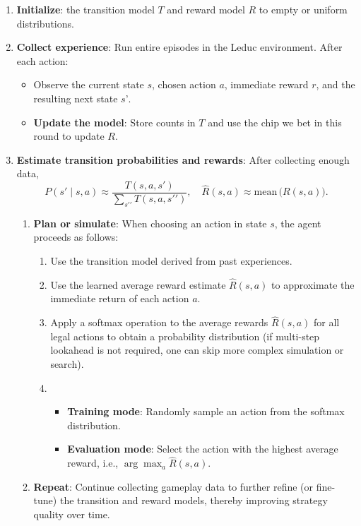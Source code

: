 \documentclass{article}
\begin{document}
\begin{enumerate}
\item \textbf{Initialize}: the transition model $T$ and reward model $R$ to empty or uniform distributions.
\item \textbf{Collect experience}: Run entire episodes in the Leduc environment. After each action:
\begin{itemize}
\item Observe the current state $s$, chosen action $a$, immediate reward $r$, and the resulting next state $s’$.
\item \textbf{Update the model}:
Store counts in $T$ and use the chip we bet in this round to update $R$.
\end{itemize}
\item \textbf{Estimate transition probabilities and rewards}: After collecting enough data,
\[
P(s{\prime} \mid s, a) \approx \frac{T(s, a, s{\prime})}{\sum_{s{\prime}{\prime}} T(s, a, s{\prime}{\prime})},
\quad
\hat{R}(s, a) \approx \text{mean}\,\bigl(R(s, a)\bigr).
\]
\begin{enumerate}
\item \textbf{Plan or simulate}: When choosing an action in state $s$, the agent proceeds as follows:
\begin{enumerate}
\item Use the transition model derived from past experiences.
\item Use the learned average reward estimate $\hat{R}(s, a)$ to approximate the immediate return of each action $a$.
\item Apply a softmax operation to the average rewards $\hat{R}(s, a)$ for all legal actions to obtain a probability distribution (if multi-step lookahead is not required, one can skip more complex simulation or search).
\item
\begin{itemize}
\item \textbf{Training mode}: Randomly sample an action from the softmax distribution.
\item \textbf{Evaluation mode}: Select the action with the highest average reward, i.e., $\arg\max_a \hat{R}(s,a)$.
\end{itemize}
\end{enumerate}
\item \textbf{Repeat}: Continue collecting gameplay data to further refine (or fine-tune) the transition and reward models, thereby improving strategy quality over time.
\end{enumerate}
\end{enumerate}
\end{document}
